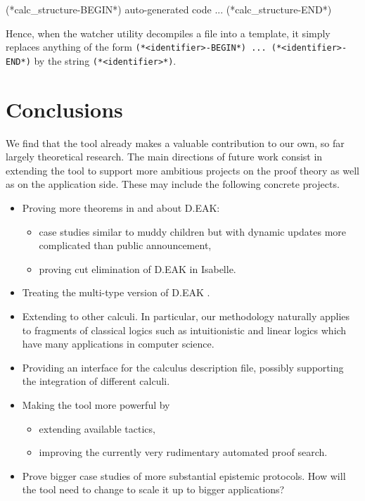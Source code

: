 \documentclass[runningheads,a4paper]{llncs}
\begin{document}
\begin{pyglist}[language = isabelle]
(*calc_structure-BEGIN*)
auto-generated code ...
(*calc_structure-END*)
\end{pyglist}

\noindent
Hence, when the watcher utility decompiles a file into a template, it simply replaces anything of the form \texttt{(*<identifier>-BEGIN*) ... (*<identifier>-END*)} by the string \texttt{(*<identifier>*)}.


\section{Conclusions}\label{sec:conclusion}
We find that the tool already makes a valuable contribution to our own, so far largely theoretical research. The main directions of future work consist in extending the tool to support more ambitious projects on the proof theory as well as on the application side. These may include the following concrete projects.

\begin{itemize}
\item Proving more theorems in and about D.EAK:
\begin{itemize}
\item  case studies similar to muddy children but with dynamic updates more complicated than public announcement,
\item proving cut elimination of D.EAK in Isabelle.
\end{itemize}
\item Treating the multi-type version of D.EAK \cite{Multitype}.
\item Extending to other calculi. In particular, our methodology naturally applies to fragments of classical logics such as intuitionistic and linear logics which have many applications in computer science. 
\item Providing an interface for the calculus description file, possibly supporting the integration of different calculi.
\item Making the tool more powerful by
\begin{itemize}
\item extending available tactics,
\item improving the currently very rudimentary automated proof search.
\end{itemize}
\item Prove bigger case studies of more substantial epistemic protocols. How will the tool need to change to scale it up to bigger applications?
\end{itemize}
\end{document}
